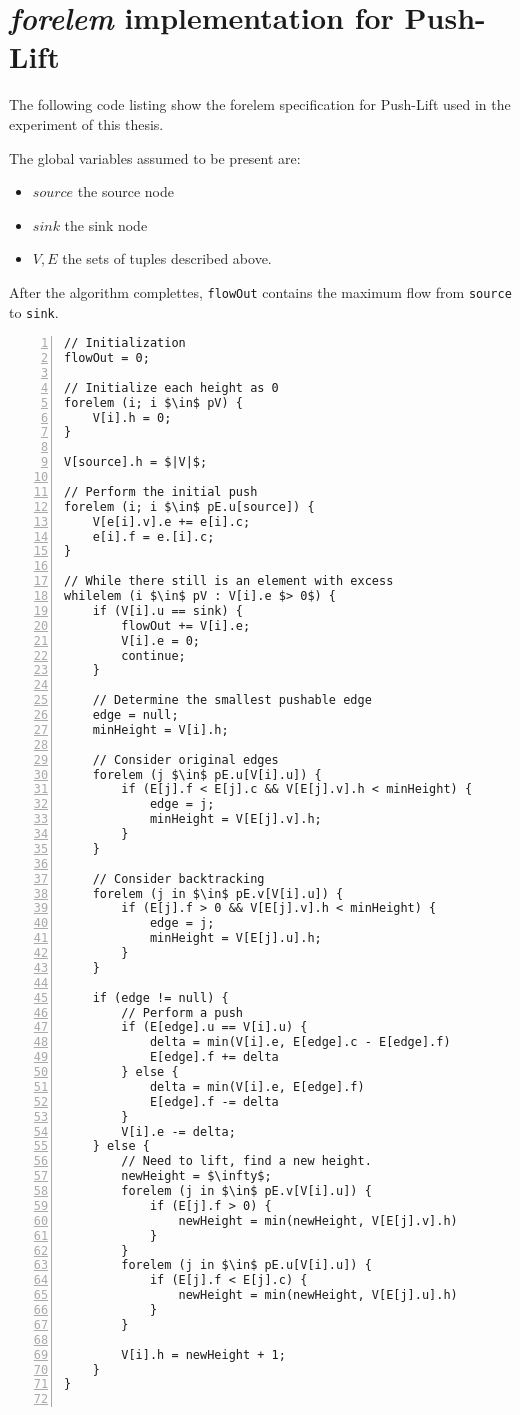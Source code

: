 \chapter{\textit{forelem} implementation for Push-Lift}

The following code listing show the forelem specification for Push-Lift used in the experiment of this thesis.

The global variables assumed to be present are:

\begin{itemize}
	\item $source$ the source node
	\item $sink$ the sink node
	\item $V, E$ the sets of tuples described above.
\end{itemize}

After the algorithm complettes, \texttt{flowOut} contains the maximum flow from \texttt{source} to \texttt{sink}.

\label{app:pushlift}
\begin{lstlisting}[mathescape,numbers=left,xleftmargin=2em]
// Initialization
flowOut = 0;

// Initialize each height as 0
forelem (i; i $\in$ pV) {
	V[i].h = 0;
}

V[source].h = $|V|$;

// Perform the initial push
forelem (i; i $\in$ pE.u[source]) {
	V[e[i].v].e += e[i].c;
	e[i].f = e.[i].c;
}

// While there still is an element with excess
whilelem (i $\in$ pV : V[i].e $> 0$) {
	if (V[i].u == sink) {
		flowOut += V[i].e;
		V[i].e = 0;
		continue;
	}

	// Determine the smallest pushable edge
	edge = null;
	minHeight = V[i].h;
	
	// Consider original edges
	forelem (j $\in$ pE.u[V[i].u]) {
		if (E[j].f < E[j].c && V[E[j].v].h < minHeight) {
			edge = j;
			minHeight = V[E[j].v].h;
		}
	}
	
	// Consider backtracking
	forelem (j in $\in$ pE.v[V[i].u]) {
		if (E[j].f > 0 && V[E[j].v].h < minHeight) {
			edge = j;
			minHeight = V[E[j].u].h;
		}
	}
	
	if (edge != null) {
		// Perform a push
		if (E[edge].u == V[i].u) {
			delta = min(V[i].e, E[edge].c - E[edge].f)
			E[edge].f += delta
		} else {
			delta = min(V[i].e, E[edge].f)
			E[edge].f -= delta
		}
		V[i].e -= delta;
	} else {
		// Need to lift, find a new height.
		newHeight = $\infty$;
		forelem (j in $\in$ pE.v[V[i].u]) {
			if (E[j].f > 0) {
				newHeight = min(newHeight, V[E[j].v].h)
			}
		}
		forelem (j in $\in$ pE.u[V[i].u]) {
			if (E[j].f < E[j].c) {
				newHeight = min(newHeight, V[E[j].u].h)
			}
		}
		
		V[i].h = newHeight + 1;
	}
}
 
\end{lstlisting}